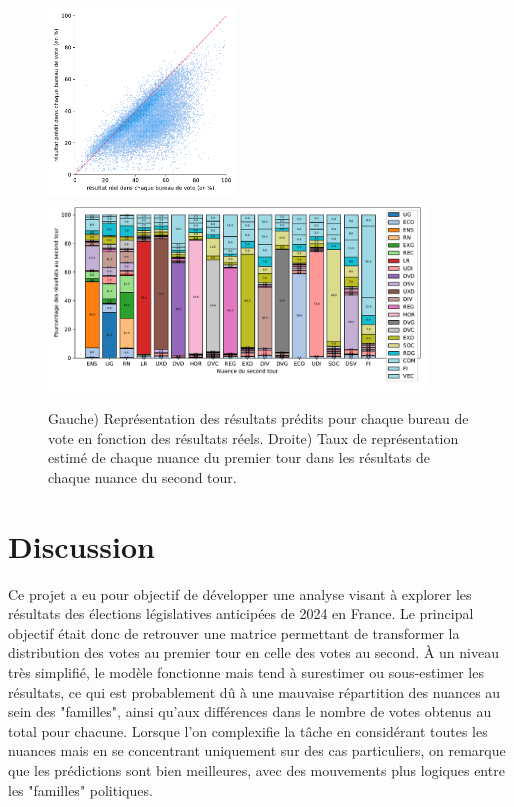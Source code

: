 \documentclass[11pt]{article}
\begin{document}
            \begin{figure}[h]
                \begin{center}
                    \includegraphics[height=5cm]{Total_True_Pred_Hist.pdf}
                    \includegraphics[height=5cm]{Total-Matrice-Participation.pdf}
                    \caption{Gauche) Représentation des résultats prédits pour chaque bureau de vote en fonction des résultats réels. Droite) Taux de représentation estimé de chaque nuance du premier tour dans les résultats de chaque nuance du second tour.}
                    \label{fig:True-Pred-Total}
                \end{center}
            \end{figure}
        
    \newpage
    \section{Discussion}
        Ce projet a eu pour objectif de développer une analyse visant à explorer les résultats des élections législatives anticipées de 2024 en France. Le principal objectif était donc de retrouver une matrice permettant de transformer la distribution des votes au premier tour en celle des votes au second.
        À un niveau très simplifié, le modèle fonctionne mais tend à surestimer ou sous-estimer les résultats, ce qui est probablement dû à une mauvaise répartition des nuances au sein des "familles", ainsi qu'aux différences dans le nombre de votes obtenus au total pour chacune.
        Lorsque l'on complexifie la tâche en considérant toutes les nuances mais en se concentrant uniquement sur des cas particuliers, on remarque que les prédictions sont bien meilleures, avec des mouvements plus logiques entre les "familles" politiques.
    
\end{document}
